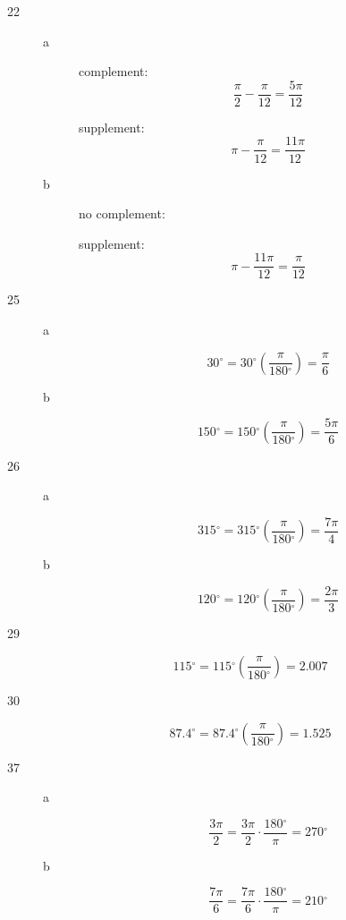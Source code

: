\documentclass[fleqn,addpoints]{exam}
\newcommand{\degree}{\ensuremath{^\circ}}
\begin{document}
\begin{description}
\begin{description}
\end{description}

\item[22]
\begin{description}
\item[a]
complement:
\[
  \frac{\pi}{2} - \frac{\pi}{12} = \frac{5 \pi}{12}
\]

supplement:
\[
  \pi - \frac{\pi}{12} = \frac{11 \pi}{12}
\]

\item[b]
no complement:

supplement:
\[
  \pi - \frac{11 \pi}{12} = \frac{\pi}{12}
\]

\end{description}

\item[25]

\begin{description}
\item[a]
\[
  30 \degree = 30\degree \left( \frac{\pi}{180 \degree} \right) = \frac{\pi}{6}
\]

\item[b]
\[
  150 \degree = 150\degree \left( \frac{\pi}{180 \degree} \right) = \frac{5\pi}{6}
\]
\end{description}

\item[26]

\begin{description}
\item[a]
\[
  315 \degree = 315 \degree \left( \frac{\pi}{180\degree} \right) = \frac{7 \pi}{4}
\]

\item[b]
\[
  120 \degree = 120 \degree \left( \frac{\pi}{180\degree} \right) = \frac{2 \pi}{3}
\]
\end{description}

\item[29]
\[
  115 \degree = 115 \degree \left( \frac{\pi}{180\degree} \right) = 2.007
\]

\item[30]
\[
  87.4 \degree = 87.4 \degree \left( \frac{\pi}{180\degree} \right) = 1.525
\]

\item[37]

\begin{description}
\item[a]
\[
  \frac{3 \pi}{2} = \frac{3 \pi}{2} \cdot \frac{180 \degree}{\pi} = 270 \degree
\]

\item[b]
\[
  \frac{7 \pi}{6} = \frac{7 \pi}{6} \cdot \frac{180 \degree}{\pi} = 210 \degree
\]
\end{description}


\end{description}
\end{document}
